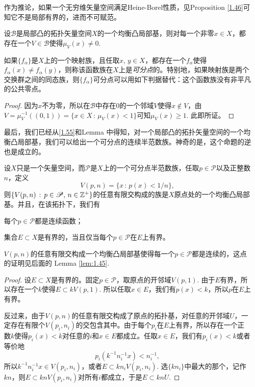 作为推论，如果一个无穷维矢量空间满足Heine-Borel性质，见Proposition \ref{1.46}可知它不是局部有界的，进而不可赋范。

\begin{lem}
设$\mathscr{B}$是局部凸的拓扑矢量空间$X$的一个均衡凸局部基，则对每一个非零$x\in X$，都存在一个$V\in \mathscr{B}$使得$\mu_V(x)\neq 0$.
\end{lem}

如果$\{f_\alpha\}$是$X$上的一个映射族，且任取$x$, $y\in X$，都存在一个$f_\alpha$使得$f_\alpha(x)\neq f_\alpha(y)$，则称该函数族在$X$上是\textit{可分点}的。特别地，如果映射族是两个交换群之间的同态族，则$\{f_\alpha\}$可分点可以用如下判据替代：这个函数族没有非平凡的公共零点。

\begin{proof}
	因为$x$不为零，所以在$\mathscr{B}$中存在$0$的一个邻域$V$使得$x\not\in V$，由$V=\mu_V^{-1}((0,1))=\{x\in X\,:\, \mu_V(x)<1\}$可知$\mu_V(x)\geq 1$. 此即所证。
\end{proof}

最后，我们已经从\ref{1.55}和Lemma \thelem 中得知，对一个局部凸的拓扑矢量空间的一个均衡凸局部基，我们可以给出一个可分点的连续半范数族。神奇的是，这个命题的逆也是成立的。

\begin{thm}\label{1.61}
设$X$只是一个矢量空间，而$\mathscr{P}$是$X$上的一个可分点半范数族，任取$p\in\mathscr{P}$以及正整数$n$，定义
\[
	V(p,n)=\{x\,:\, p(x)<1/n\},
\]
则$\{V(p,n)\,:\, p\in\mathscr{P},\, n\in \mathbb{Z}^+\}$的任意有限交构成的族是$X$原点处的一个均衡凸局部基。并且，在该拓扑下，我们有
\begin{compactenum}[~~~(a)]
\item 每个$p\in \mathscr{P}$都是连续函数；
\item 集合$E\subset X$是有界的，当且仅当每个$p\in \mathscr{P}$在$E$上有界。
\end{compactenum}
\end{thm}

$V(p,n)$的任意有限交构成一个均衡凸局部基使得每一个$p\in \mathscr{P}$都是连续的，这点的证明见后面的 Lemma \ref{lem:1.45}. 

\begin{proof}
	设$E\subset X$是有界的。固定$p\in \mathscr{P}$，取原点的开邻域$V(p,1)$. 由于$E$有界，所以存在一个$k$使得$E\subset kV(p,1)$. 所以任取$x\in E$，我们有$p(x)<k$，所以$p$在$E$上有界。
	
	反过来，由于$V(p,n)$的任意有限交构成了原点的拓扑基，对任意的开邻域$U$，一定存在有限个$V(p_i,n_i)$的交包含其中。由于每个$p_i$在$E$上有界，所以存在一个正数$k$使得$p_i(x)<k$对任意的$i$和$x\in E$都成立。任取$x\in E$，我们有$p_i(x)<k$或者等价地
	\[
		p_i(k^{-1}n_i^{-1}x)<n_i^{-1},
	\]
	所以$k^{-1}n_i^{-1}x\in V(p_i,n_i)$，或者$E\subset kn_iV(p_i,n_i)$. 选$\{kn_i\}$中最大的那个，记作$kn$，则$E\subset kn V(p_i,n_i)$对所有$i$都成立，于是$E\subset kn U$.
\end{proof}

